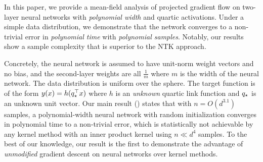 In this paper, we provide a mean-field analysis of projected gradient flow on two-layer neural networks with \textit{polynomial width} and quartic activations. Under a simple data distribution, we demonstrate that the network converges to a non-trivial error in \textit{polynomial time} with \textit{polynomial samples}. Notably, our results show a sample complexity that is superior to the NTK approach.


Concretely, the neural network is assumed to have unit-norm weight vectors and no bias, and the second-layer weights are all $\frac{1}{m}$ where $m$ is the width of the neural network. The data distribution is uniform over the sphere. The target function is of the form 	$y(x) = h(q_\star^\top x)$ where $h$ is an \textit{unknown} quartic link function and $q_\star$ is an unknown unit vector. 
Our main result () states that with $n = O(d^{3.1})$ samples,  a polynomial-width neural network with random initialization converges in polynomial time to a non-trivial error, which is statistically not achievable by any kernel method with an inner product kernel using $n \ll d^4$ samples.  To the best of our knowledge, our result is the first to demonstrate the advantage of \textit{unmodified} gradient descent on neural networks over kernel methods.

